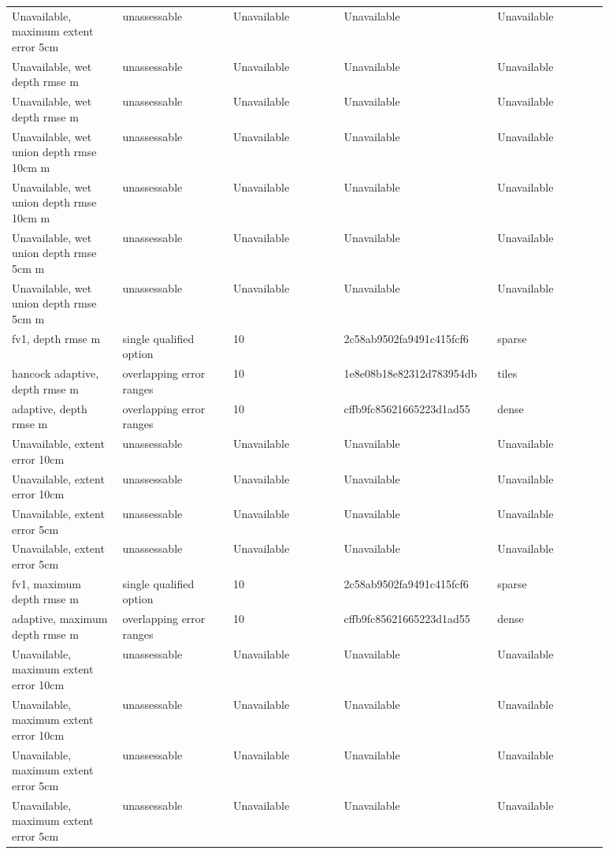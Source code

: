 \begin{longtable}{p{0.1760\linewidth}p{0.1760\linewidth}p{0.1760\linewidth}p{0.1760\linewidth}p{0.1760\linewidth}}
Unavailable, maximum extent error 5cm & unassessable & Unavailable & Unavailable & Unavailable \\
Unavailable, wet depth rmse m & unassessable & Unavailable & Unavailable & Unavailable \\
Unavailable, wet depth rmse m & unassessable & Unavailable & Unavailable & Unavailable \\
Unavailable, wet union depth rmse 10cm m & unassessable & Unavailable & Unavailable & Unavailable \\
Unavailable, wet union depth rmse 10cm m & unassessable & Unavailable & Unavailable & Unavailable \\
Unavailable, wet union depth rmse 5cm m & unassessable & Unavailable & Unavailable & Unavailable \\
Unavailable, wet union depth rmse 5cm m & unassessable & Unavailable & Unavailable & Unavailable \\
fv1, depth rmse m & single qualified option & 10 & 2c58ab9502fa9491c415fcf6 & sparse \\
hancock adaptive, depth rmse m & overlapping error ranges & 10 & 1e8e08b18e82312d783954db & tiles \\
adaptive, depth rmse m & overlapping error ranges & 10 & cffb9fc85621665223d1ad55 & dense \\
Unavailable, extent error 10cm & unassessable & Unavailable & Unavailable & Unavailable \\
Unavailable, extent error 10cm & unassessable & Unavailable & Unavailable & Unavailable \\
Unavailable, extent error 5cm & unassessable & Unavailable & Unavailable & Unavailable \\
Unavailable, extent error 5cm & unassessable & Unavailable & Unavailable & Unavailable \\
fv1, maximum depth rmse m & single qualified option & 10 & 2c58ab9502fa9491c415fcf6 & sparse \\
adaptive, maximum depth rmse m & overlapping error ranges & 10 & cffb9fc85621665223d1ad55 & dense \\
Unavailable, maximum extent error 10cm & unassessable & Unavailable & Unavailable & Unavailable \\
Unavailable, maximum extent error 10cm & unassessable & Unavailable & Unavailable & Unavailable \\
Unavailable, maximum extent error 5cm & unassessable & Unavailable & Unavailable & Unavailable \\
Unavailable, maximum extent error 5cm & unassessable & Unavailable & Unavailable & Unavailable \\

\end{longtable}
